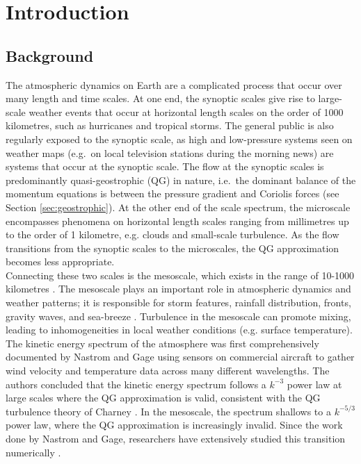 \newpage
\chapter{Introduction}
\label{ch:ch1}

\section{Background}
\label{sec:introduction}

The atmospheric dynamics on Earth are a complicated process that occur over many length and time scales. At one end, the synoptic scales give rise to large-scale weather events that occur at horizontal length scales on the order of 1000 kilometres, such as hurricanes and tropical storms. The general public is also regularly exposed to the synoptic scale, as high and low-pressure systems seen on weather maps (e.g.\ on local television stations during the morning news) are systems that occur at the synoptic scale. The flow at the synoptic scales is predominantly quasi-geostrophic (QG) in nature, i.e.\ the dominant balance of the momentum equations is between the pressure gradient and Coriolis forces (see Section \ref{sec:geostrophic}). At the other end of the scale spectrum, the microscale encompasses phenomena on horizontal length scales ranging from millimetres up to the order of 1 kilometre, e.g. clouds and small-scale turbulence. As the flow transitions from the synoptic scales to the microscales, the QG approximation becomes less appropriate.\\

Connecting these two scales is the mesoscale, which exists in the range of 10-1000 kilometres \cite{Lin2008}. The mesoscale plays an important role in atmospheric dynamics and weather patterns; it is responsible for storm features, rainfall distribution, fronts, gravity waves, and sea-breeze \cite{Parker2014}. Turbulence in the mesoscale can promote mixing, leading to inhomogeneities in local weather conditions (e.g. surface temperature).\\

The kinetic energy spectrum of the atmosphere was first comprehensively documented by Nastrom and Gage \cite{Nastrom1985} using sensors on commercial aircraft to gather wind velocity and temperature data across many different wavelengths. The authors concluded that the kinetic energy spectrum follows a $k^{-3}$ power law at large scales where the QG approximation is valid, consistent with the QG turbulence theory of Charney \cite{Charney1971}. In the mesoscale, the spectrum shallows to a $k^{-5/3}$ power law, where the QG approximation is increasingly invalid. Since the work done by Nastrom and Gage, researchers have extensively studied this transition numerically \cite{Waite2009,Terasaki2011,Kitamura2010,Hamilton2008,Peng2013,Takahashi2006}.\\

